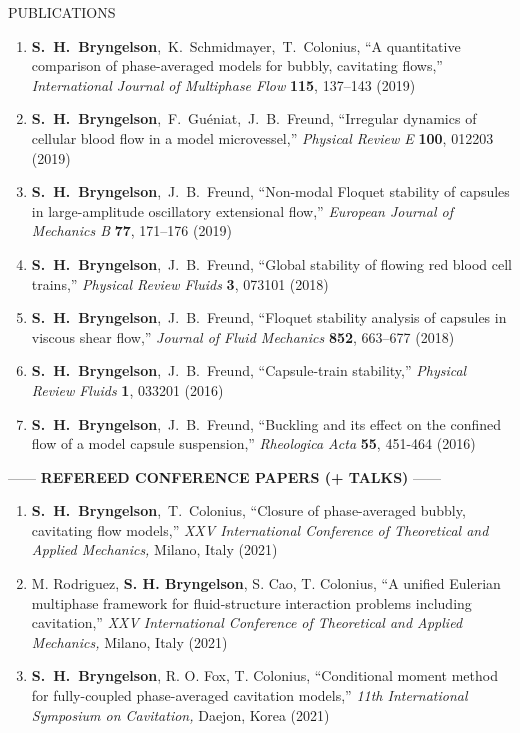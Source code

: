 \documentclass{resume} %
\makeatletter
\newlength{\bibhang}
\newlength{\bibsep}
\newenvironment{bibsection}%
        {\begin{enumerate}{}{%
       \setlength{\leftmargin}{\bibhang}%
       \setlength{\itemindent}{-\leftmargin}%
       \setlength{\itemsep}{\bibsep}%
       \setlength{\parsep}{\z@}%
        \setlength{\topsep}{0pt}}}
        {\end{enumerate}\vspace{-.1\baselineskip}}
\newcommand\SHB{\mbox{\textbf{S. H. Bryngelson}}}
\newcommand\Authors{\mbox{\textbf{S. H. Bryngelson}, J. B. Freund}}
\newcommand\FloAuthors{\mbox{\textbf{S. H. Bryngelson}, F. Gu\'{e}niat, J. B. Freund}}
\newcommand\SpencerTim{\mbox{\textbf{S. H. Bryngelson}, T. Colonius}}
\newcommand\SpencerKevinTim{\mbox{\textbf{S. H. Bryngelson}, K. Schmidmayer, T. Colonius}}
\newcommand{\ICTAM}{International Conference of Theoretical and Applied Mechanics}
\newcommand{\IJMF}{International Journal of Multiphase Flow}
\newcommand{\PRE}{Physical Review E}
\newcommand{\EJM}{European Journal of Mechanics B}
\newcommand{\PRF}{Physical Review Fluids}
\newcommand{\JFM}{Journal of Fluid Mechanics}
\newcommand{\RA}{Rheologica Acta}
\makeatother
\begin{document}
\begin{rSection}{{\Large P}UBLICATIONS}
\begin{bibsection}
	\item \SpencerKevinTim, 
	``A quantitative comparison of phase\hyp{}averaged models for bubbly, cavitating flows,'' 
	\emph{\IJMF} \textbf{115}, 137--143 (2019)

	\item \FloAuthors,  
	``Irregular dynamics of cellular blood flow in a model microvessel,'' 
    \emph{\PRE} \textbf{100}, 012203 (2019)
	
	\item  \Authors, 
	``Non-modal Floquet stability of capsules in large-amplitude oscillatory extensional flow,'' 
    \emph{\EJM} \textbf{77}, 171--176 (2019)

	\item  \Authors, 
	``Global stability of flowing red blood cell trains,'' 	
	\emph{\PRF} \textbf{3}, 073101 (2018)	
	
	\item  \Authors, 
	``Floquet stability analysis of capsules in viscous shear flow,'' 
	\emph{\JFM} \textbf{852}, 663--677 (2018) 
	
	\item \Authors, 
	``Capsule-train stability,''
	\emph{\PRF} \textbf{1}, 033201 (2016)	
	
	\item \Authors, 
	``Buckling and its effect on the confined flow of a model capsule suspension,'' 
	\emph{\RA} \textbf{55}, 451-464 (2016)
\end{bibsection}
\medskip 

\begin{center}
    ------ \textbf{REFEREED CONFERENCE PAPERS (+ TALKS)} ------
\end{center}

\begin{bibsection}
    \setlength{\itemsep}{\bibsep}%
	\item \SpencerTim, 
    ``Closure of phase-averaged bubbly, cavitating flow models,'' 
    \textit{XXV \ICTAM,} Milano, Italy (2021)

    \item M. Rodriguez, \textbf{S. H. Bryngelson}, S. Cao, T. Colonius, 
    ``A unified Eulerian multiphase framework for fluid-structure interaction problems including cavitation,'' 
	\textit{XXV \ICTAM,} Milano, Italy (2021)	

    \item \SHB, R. O. Fox, T. Colonius,
    ``Conditional moment method for fully-coupled phase-averaged cavitation models,''
    \textit{11th International Symposium on Cavitation,} Daejon, Korea (2021)


\end{bibsection}
\end{rSection}
\end{document}
